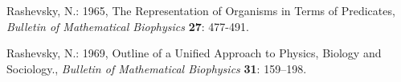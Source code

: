 \documentclass[12pt]{article}
\begin{document}
\begin{thebibliography}{9}

Rashevsky, N.: 1965, The Representation of Organisms in Terms of
Predicates, \emph{Bulletin of Mathematical Biophysics} \textbf{27}: 477-491.

Rashevsky, N.: 1969, Outline of a Unified Approach to Physics, Biology and Sociology., \emph{Bulletin of Mathematical Biophysics} \textbf{31}: 159--198.

\end{thebibliography}
\end{document}
